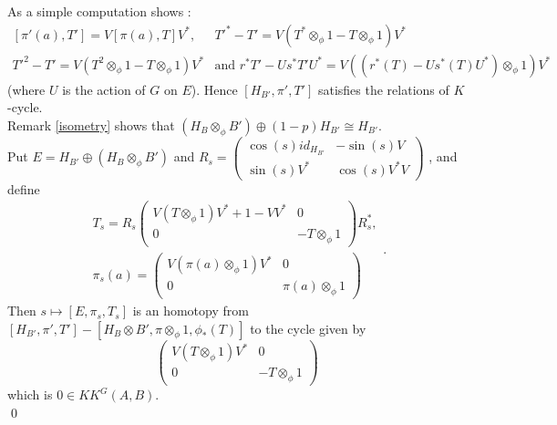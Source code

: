 \begin{dem}
As a simple computation shows : 
\[\begin{array}{ll} [\pi'(a),T'] = V[\pi(a),T]V^*, &  T'^*-T' = V(T^*\otimes_\phi 1-T\otimes_\phi 1)V^* \\
 T'^2-T' = V(T^2\otimes_\phi 1-T\otimes_\phi 1)V^* & \text{and } r^* T' - U s^*T' U^* = V((r^*(T) - U s^*(T) U^*)\otimes_\phi 1 ) V^*
\end{array} \]
(where $U$ is the action of $G$ on $E$). Hence $[H_{B'},\pi',T']$ satisfies the relations of $K$-cycle.\\

Remark \ref{isometry} shows that $ (H_B\otimes_\phi B' )\oplus (1-p) H_{B'} \cong H_{B'}$.\\

Put $E= H_{B'} \oplus (H_B\otimes_\phi B')$ and $R_s =\begin{pmatrix} \cos (s) id_{H_{B'}} & -\sin (s) V \\  \sin (s)V^* & \cos (s) V^*V \end{pmatrix}$ , and define
\[\begin{array}{c} 
T_s = R_s\begin{pmatrix} V(T\otimes_\phi 1)V^* +1-VV^* & 0 \\ 0 & -T\otimes_\phi 1 \end{pmatrix}R_s^*,\\
\pi_s(a)= \begin{pmatrix} V(\pi(a)\otimes_\phi 1) V^* & 0 \\ 0 & \pi(a)\otimes_\phi 1\end{pmatrix}
\end{array}.\]
Then $ s\mapsto [E, \pi_s,T_s ] $ is an homotopy from $[H_{B'}, \pi', T']-[H_B\otimes B',\pi\otimes_\phi 1,\phi_*(T)]$ to the cycle given by 
\[\begin{pmatrix} V(T\otimes_\phi 1)V^*  & 0 \\ 0 & -T\otimes_\phi 1 \end{pmatrix}\]
which is $0\in KK^G(A,B)$. \\
\qed\end{dem}






































